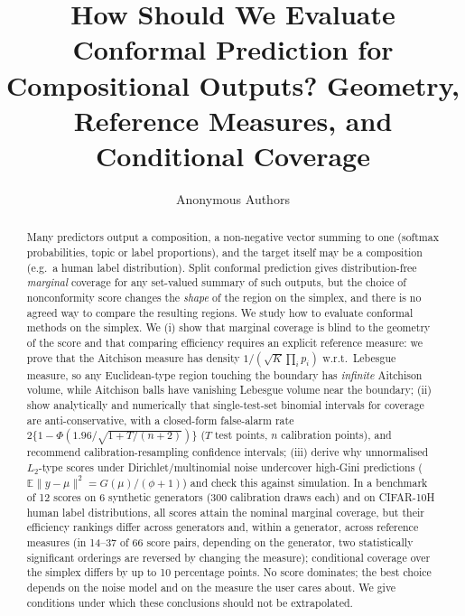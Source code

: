 \documentclass{article}
\title{How Should We Evaluate Conformal Prediction for Compositional Outputs? Geometry, Reference Measures, and Conditional Coverage}
\author{Anonymous Authors}
\newcommand{\Gini}{G}
\newcommand{\EE}{\mathbb{E}}
\begin{document}
\maketitle

\begin{abstract}
Many predictors output a composition, a non-negative vector summing to one (softmax probabilities, topic or label proportions), and the target itself may be a composition (e.g.\ a human label distribution). Split conformal prediction gives distribution-free \emph{marginal} coverage for any set-valued summary of such outputs, but the choice of nonconformity score changes the \emph{shape} of the region on the simplex, and there is no agreed way to compare the resulting regions. We study how to evaluate conformal methods on the simplex. We (i) show that marginal coverage is blind to the geometry of the score and that comparing efficiency requires an explicit reference measure: we prove that the Aitchison measure has density $1/(\sqrt K\prod_i p_i)$ w.r.t.\ Lebesgue measure, so any Euclidean-type region touching the boundary has \emph{infinite} Aitchison volume, while Aitchison balls have vanishing Lebesgue volume near the boundary; (ii) show analytically and numerically that single-test-set binomial intervals for coverage are anti-conservative, with a closed-form false-alarm rate $2\{1-\Phi(1.96/\sqrt{1+T/(n+2)})\}$ ($T$ test points, $n$ calibration points), and recommend calibration-resampling confidence intervals; (iii) derive why unnormalised $L_2$-type scores under Dirichlet/multinomial noise undercover high-Gini predictions ($\EE\|y-\mu\|^2=\Gini(\mu)/(\phi+1)$) and check this against simulation. In a benchmark of 12 scores on 6 synthetic generators (300 calibration draws each) and on CIFAR-10H human label distributions, all scores attain the nominal marginal coverage, but their efficiency rankings differ across generators and, within a generator, across reference measures (in 14--37 of 66 score pairs, depending on the generator, two statistically significant orderings are reversed by changing the measure); conditional coverage over the simplex differs by up to 10 percentage points. No score dominates; the best choice depends on the noise model and on the measure the user cares about. We give conditions under which these conclusions should not be extrapolated.
\end{abstract}
\end{document}
